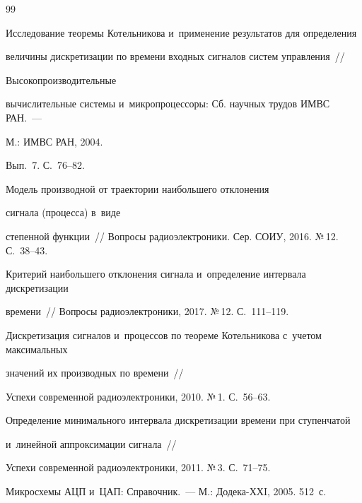 {{\begin{thebibliography}{99}




Исследование теоремы Котельникова и~применение результатов для определения 


величины дискретизации по времени входных сигналов систем управ\-ле\-ния~/\!\!/ 


Высокопроизводительные 


вычислительные системы и~микропроцессоры: Сб. научных трудов ИМВС РАН.~---


М.: ИМВС РАН, 2004. 


Вып.~7. С.~76--82.




 Модель производной от траектории наибольшего отклонения 


сигнала (процесса) в~виде 


степенной функции~/\!\!/ Вопросы радиоэлектроники. Сер. СОИУ, 2016. №\,12. С.~38--43.




 Критерий наибольшего отклонения сигнала и~определение интервала дискретизации 


времени~/\!\!/ Вопросы радиоэлектроники, 2017. №\,12. С.~111--119.









Дискретизация сигналов и~процессов по теореме Котельникова с~учетом максимальных 


значений их производных по времени~/\!\!/ 


Успехи современной радиоэлектроники, 2010. №\,1. С.~56--63.






 Определение минимального интервала дискретизации времени при ступенчатой 


 и~линейной аппроксимации сигнала~/\!\!/ 


 Успехи современной радиоэлектроники, 2011. №\,3. С.~71--75.




Микросхемы АЦП и~ЦАП: Справочник.~--- М.: Додека-ХХI, 2005. 512~с.





        \end{thebibliography}


} }









